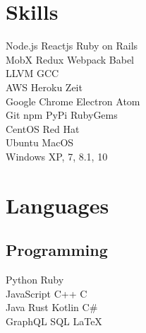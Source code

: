 \documentclass[]{resume}
\begin{document}
\begin{minipage}[t]{0.30\textwidth}

\section{Skills}
Node.js \textbullet{} Reactjs \textbullet{} Ruby on Rails \\
MobX \textbullet{} Redux \textbullet{} Webpack \textbullet{} Babel \\
LLVM \textbullet{} GCC \\

AWS \textbullet{} Heroku \textbullet{} Zeit \\
Google Chrome \textbullet{} Electron \textbullet{} Atom \\

Git \textbullet{} npm \textbullet{} PyPi \textbullet{} RubyGems \\

CentOS \textbullet{} Red Hat \\
Ubuntu \textbullet{} MacOS \\
Windows XP, 7, 8.1, 10 \\

\sectionsep


\section{Languages}
\subsection{Programming}
Python \textbullet{} Ruby \\
JavaScript \textbullet{} C++ \textbullet{} C \\
Java \textbullet{} Rust \textbullet{} Kotlin \textbullet{} C\# \\
GraphQL \textbullet{} SQL \textbullet{} \LaTeX \\


\end{minipage}
\end{document}
